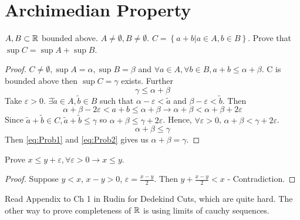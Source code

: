


\section{Archimedian Property}

\begin{problem}
	\( A,B \subset \mathbb{R} \) bounded above. \( A \not = \emptyset, B \not = \emptyset \).
	\( C = \left\{ a + b| a \in A, b \in B \right\} \). 
	Prove that \( \sup C = \sup A + \sup B \). 
\end{problem}

\begin{proof}
	\( C \not = \emptyset, \sup A = \alpha, \sup B = \beta \) and 
	\( \forall a \in A, \forall b \in B, a + b \le \alpha + \beta \). 
	C is bounded above then \( \sup C = \gamma \) exists. 
	Further 
	\begin{equation}
		\gamma \le \alpha + \beta 
		\label{eq:Prob1}
	\end{equation}
	Take \( \varepsilon > 0 \). 
	\( \exists \tilde{a} \in A, \tilde{b} \in B \) such that 
	\( \alpha - \varepsilon < \tilde{a} \) and \( \beta - \varepsilon < \tilde{b} \). 
	Then
	\[
		\alpha + \beta - 2 \varepsilon < a + b \le \alpha + \beta \rightarrow
		\alpha + \beta < \alpha + \beta + 2\varepsilon
	\]
	Since \( \tilde{a} + \tilde{b} \in C, \tilde{a} + \tilde{b} \le \gamma  \) so 
	\( \alpha + \beta \le \gamma + 2\varepsilon \). 
	Hence, \( \forall \varepsilon > 0 \), \( \alpha + \beta < \gamma + 2\varepsilon \).
	\begin{equation}
		\alpha + \beta \le \gamma
		\label{eq:Prob2}
	\end{equation}
	Then \ref{eq:Prob1} and \ref{eq:Prob2} gives us \( \alpha + \beta = \gamma \).
\end{proof}

\begin{problem}
	Prove \( x \le y + \varepsilon, \forall \varepsilon > 0 \rightarrow x \le y \).
\end{problem}

\begin{proof}
	Suppose \( y < x \), \( x-y > 0 \), \( \varepsilon = \frac{x-y}{2} \). 
	Then \( y + \frac{x-y}{2} < x \) - Contradiction.
\end{proof}

Read Appendix to Ch 1 in Rudin for Dedekind Cuts, which are quite hard. The other way to prove
completeness of \( \mathbb{R} \) is using limits of cauchy sequences. 

